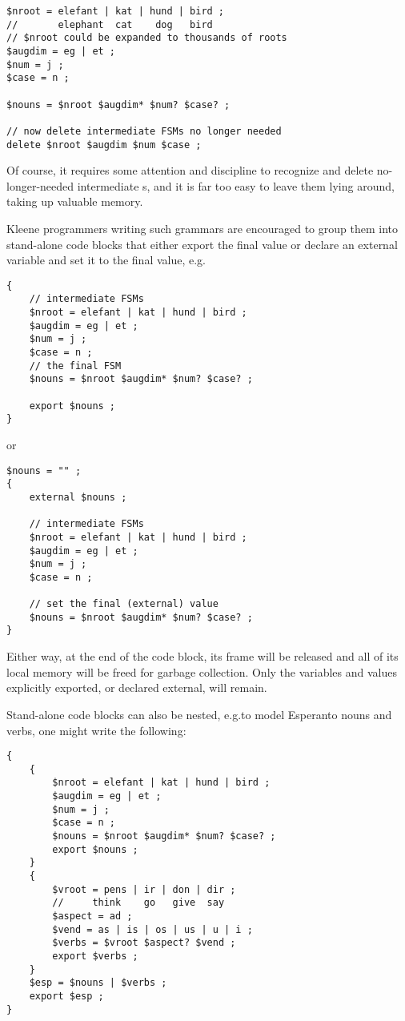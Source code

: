 \begin{Verbatim}
$nroot = elefant | kat | hund | bird ;  
//       elephant  cat    dog   bird
// $nroot could be expanded to thousands of roots
$augdim = eg | et ;
$num = j ;
$case = n ;

$nouns = $nroot $augdim* $num? $case? ;

// now delete intermediate FSMs no longer needed
delete $nroot $augdim $num $case ;
\end{Verbatim}

\noindent
Of course, it requires some attention and discipline
to recognize and delete no-longer-needed intermediate \fsm{}s,
and it is far too easy to leave them lying around, taking up valuable memory.  

Kleene programmers writing such grammars are encouraged to group them into stand-alone 
code blocks that
either export the final value or declare an external variable and set it to the final
value, e.g.

\begin{samepage}
\begin{Verbatim}
{
    // intermediate FSMs 
    $nroot = elefant | kat | hund | bird ;
    $augdim = eg | et ;
    $num = j ;
    $case = n ;
    // the final FSM 
    $nouns = $nroot $augdim* $num? $case? ;

    export $nouns ;
}
\end{Verbatim}
\end{samepage}

\noindent
or

\begin{Verbatim}
$nouns = "" ;
{
    external $nouns ;

    // intermediate FSMs 
    $nroot = elefant | kat | hund | bird ;
    $augdim = eg | et ;
    $num = j ;
    $case = n ;

    // set the final (external) value
    $nouns = $nroot $augdim* $num? $case? ;
}
\end{Verbatim}

\noindent
Either way, at the end of the code block, its frame will be released and
all of its local memory will be freed for garbage collection.  Only the
variables and values explicitly exported, or declared external, will
remain.

Stand-alone code blocks can also be nested, e.g.\@ to model Esperanto
nouns and verbs, one might write the following:

\begin{Verbatim}
{
    {
        $nroot = elefant | kat | hund | bird ;
        $augdim = eg | et ;
        $num = j ;
        $case = n ;
        $nouns = $nroot $augdim* $num? $case? ;
        export $nouns ;
    }
    {
        $vroot = pens | ir | don | dir ;
        //     think    go   give  say
        $aspect = ad ;
        $vend = as | is | os | us | u | i ;
        $verbs = $vroot $aspect? $vend ;
        export $verbs ;
    }
    $esp = $nouns | $verbs ;
    export $esp ;
}
\end{Verbatim}

